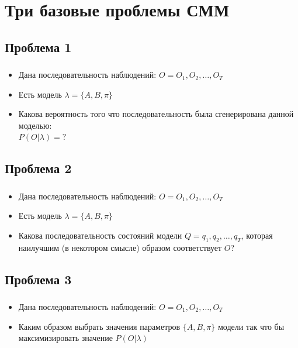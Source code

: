 \documentclass{beamer}
\begin{document}
\section{Три базовые проблемы СММ}
\subsection{Проблема 1}

\begin{frame}
  \frametitle{\insertsection}
  \framesubtitle{\insertsubsection}
  \begin{itemize}
  \item Дана последовательность наблюдений: $O = O_1, O_2, \ldots, O_T$ \pause
  \item Есть модель $\lambda = \{A, B, \pi \}$ \pause
  \item Какова вероятность того что последовательность была сгенерирована данной моделью: \\
    $P(O | \lambda) = ?$
  \end{itemize}
\end{frame}

\subsection{Проблема 2}

\begin{frame}
  \frametitle{\insertsection}
  \framesubtitle{\insertsubsection}
  \begin{itemize}
  \item Дана последовательность наблюдений: $O = O_1, O_2, \ldots, O_T$ \pause
  \item Есть модель $\lambda = \{A, B, \pi \}$ \pause
  \item Какова последовательность состояний модели $Q = q_1, q_2, \ldots, q_T$, которая наилучшим (в некотором смысле) образом соответствует $O$?
  \end{itemize}
\end{frame}

\subsection{Проблема 3}

\begin{frame}
  \frametitle{\insertsection}
  \framesubtitle{\insertsubsection}
  \begin{itemize}
  \item Дана последовательность наблюдений: $O = O_1, O_2, \ldots, O_T$ \pause
  \item Каким образом выбрать значения параметров $\{A, B, \pi\}$ модели так что бы максимизировать значение $P(O|\lambda)$
  \end{itemize}
\end{frame}
\end{document}
